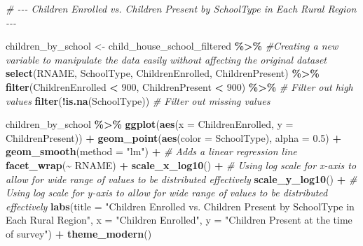 \documentclass[
]{article}
\newenvironment{Shaded}{\begin{snugshade}}{\end{snugshade}}
\newcommand{\AttributeTok}[1]{\textcolor[rgb]{0.13,0.29,0.53}{#1}}
\newcommand{\CommentTok}[1]{\textcolor[rgb]{0.56,0.35,0.01}{\textit{#1}}}
\newcommand{\DecValTok}[1]{\textcolor[rgb]{0.00,0.00,0.81}{#1}}
\newcommand{\FloatTok}[1]{\textcolor[rgb]{0.00,0.00,0.81}{#1}}
\newcommand{\FunctionTok}[1]{\textcolor[rgb]{0.13,0.29,0.53}{\textbf{#1}}}
\newcommand{\NormalTok}[1]{#1}
\newcommand{\OtherTok}[1]{\textcolor[rgb]{0.56,0.35,0.01}{#1}}
\newcommand{\SpecialCharTok}[1]{\textcolor[rgb]{0.81,0.36,0.00}{\textbf{#1}}}
\newcommand{\StringTok}[1]{\textcolor[rgb]{0.31,0.60,0.02}{#1}}
\begin{document}
\begin{Shaded}
\begin{Highlighting}[]
\CommentTok{\# {-}{-}{-} Children Enrolled vs. Children Present by SchoolType in Each Rural Region {-}{-}{-}}

\NormalTok{children\_by\_school }\OtherTok{\textless{}{-}}\NormalTok{ child\_house\_school\_filtered }\SpecialCharTok{\%\textgreater{}\%} \CommentTok{\#Creating a new variable to manipulate the data easily without affecting the original dataset}
  \FunctionTok{select}\NormalTok{(RNAME, SchoolType, ChildrenEnrolled, ChildrenPresent) }\SpecialCharTok{\%\textgreater{}\%}
  \FunctionTok{filter}\NormalTok{(ChildrenEnrolled }\SpecialCharTok{\textless{}} \DecValTok{900}\NormalTok{, ChildrenPresent }\SpecialCharTok{\textless{}} \DecValTok{900}\NormalTok{) }\SpecialCharTok{\%\textgreater{}\%}  \CommentTok{\# Filter out high values}
  \FunctionTok{filter}\NormalTok{(}\SpecialCharTok{!}\FunctionTok{is.na}\NormalTok{(SchoolType))  }\CommentTok{\# Filter out missing values}

\NormalTok{children\_by\_school }\SpecialCharTok{\%\textgreater{}\%}
  \FunctionTok{ggplot}\NormalTok{(}\FunctionTok{aes}\NormalTok{(}\AttributeTok{x =}\NormalTok{ ChildrenEnrolled, }\AttributeTok{y =}\NormalTok{ ChildrenPresent)) }\SpecialCharTok{+}
  \FunctionTok{geom\_point}\NormalTok{(}\FunctionTok{aes}\NormalTok{(}\AttributeTok{color =}\NormalTok{ SchoolType), }\AttributeTok{alpha =} \FloatTok{0.5}\NormalTok{) }\SpecialCharTok{+}
  \FunctionTok{geom\_smooth}\NormalTok{(}\AttributeTok{method =} \StringTok{"lm"}\NormalTok{) }\SpecialCharTok{+} \CommentTok{\# Adds a linear regression line}
  \FunctionTok{facet\_wrap}\NormalTok{(}\SpecialCharTok{\textasciitilde{}}\NormalTok{ RNAME) }\SpecialCharTok{+}
  \FunctionTok{scale\_x\_log10}\NormalTok{() }\SpecialCharTok{+} \CommentTok{\# Using log scale for x{-}axis to allow for wide range of values to be distributed effectively}
  \FunctionTok{scale\_y\_log10}\NormalTok{() }\SpecialCharTok{+} \CommentTok{\# Using log scale for y{-}axis to allow for wide range of values to be distributed effectively}
  \FunctionTok{labs}\NormalTok{(}\AttributeTok{title =} \StringTok{"Children Enrolled vs. Children Present by SchoolType in Each Rural Region"}\NormalTok{,}
       \AttributeTok{x =} \StringTok{"Children Enrolled"}\NormalTok{,}
       \AttributeTok{y =} \StringTok{"Children Present at the time of survey"}\NormalTok{) }\SpecialCharTok{+}
  \FunctionTok{theme\_modern}\NormalTok{()}
\end{Highlighting}
\end{Shaded}
\end{document}
